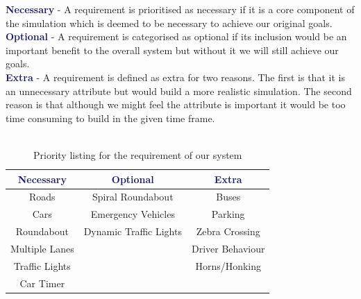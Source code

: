 \documentclass{article}
\begin{document}
	\noindent
	\textcolor{MidnightBlue}{\bf Necessary}
	- A requirement is prioritised as necessary if it is a core component of the simulation which is deemed to be necessary to achieve our original goals.\\
	
	\noindent
	\textcolor{MidnightBlue}{\bf Optional} - A requirement is categorised as optional if its inclusion would be an important benefit to the overall system but without it we will still achieve our goals.\\
	
	\noindent
	\textcolor{MidnightBlue}{\bf Extra} - A requirement is defined as extra for two reasons. 
	The first is that it is an unnecessary attribute but would build a more realistic simulation. 
	The second reason is that although we might feel the attribute is important it would be too time consuming to build in the given time frame.\\\\
	
	
	
	
	\begin{table}[H] 
		\centering
		\label{PriorityListing}
		\begin{tabular}{|c|c|c|}
			\hline \rule{0pt}{2.5ex}
			\textcolor{MidnightBlue}{\bf Necessary}      & \textcolor{MidnightBlue}{\bf Optional} & \textcolor{MidnightBlue}{\bf Extra}   \\ \hline \rule{0pt}{2.5ex}
			Roads & Spiral Roundabout & Buses  \\ 
			Cars & Emergency Vehicles & Parking \\ 
			Roundabout & Dynamic Traffic Lights & Zebra Crossing \\ 
			Multiple Lanes & & Driver Behaviour  \\
			Traffic Lights & & Horns/Honking \\
			Car Timer  & & \\ \hline 
		\end{tabular}
		\caption{Priority listing for the requirement of our system}
		\label{requirements}
		
	\end{table}
    
\end{document}
